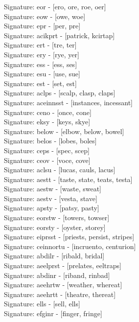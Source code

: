 Signature: {eor} - [ero, ore, roe, oer] \\
Signature: {eow} - [owe, woe] \\
Signature: {epr} - [per, pre] \\
Signature: {acikprt} - [patrick, kcirtap] \\
Signature: {ert} - [tre, ter] \\
Signature: {ery} - [rye, yer] \\
Signature: {ess} - [ess, ses] \\
Signature: {esu} - [use, sue] \\
Signature: {est} - [set, est] \\
Signature: {aclps} - [scalp, clasp, claps] \\
Signature: {aceinnsst} - [instances, incessant] \\
Signature: {ceno} - [once, cone] \\
Signature: {eksy} - [keys, skye] \\
Signature: {below} - [elbow, below, bowel] \\
Signature: {belos} - [lobes, boles] \\
Signature: {ceps} - [spec, scep] \\
Signature: {ceov} - [voce, cove] \\
Signature: {aclsu} - [lucas, cauls, lacus] \\
Signature: {aestt} - [taste, state, teats, testa] \\
Signature: {aestw} - [waste, sweat] \\
Signature: {aestv} - [vesta, stave] \\
Signature: {apsty} - [patsy, pasty] \\
Signature: {eorstw} - [towers, towser] \\
Signature: {eorsty} - [oyster, storey] \\
Signature: {eiprsst} - [priests, persist, stripes] \\
Signature: {ceinnortu} - [incruento, centurion] \\
Signature: {abdilr} - [ribald, bridal] \\
Signature: {aeelprst} - [prelates, eeltraps] \\
Signature: {abdinr} - [riband, rinbad] \\
Signature: {aeehrtw} - [weather, whereat] \\
Signature: {aeehrtt} - [theatre, thereat] \\
Signature: {ells} - [sell, ells] \\
Signature: {efginr} - [finger, fringe] \\

